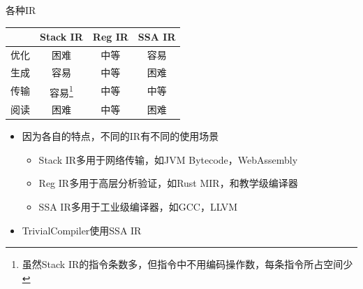 \documentclass{beamer}
\begin{document}
\begin{frame}{各种IR}
\begin{table}[]
  \centering
  \begin{tabular}{|c|c|c|c|}
    \hline
    & Stack IR & Reg IR & SSA IR \\ \hline
    优化 & \textcolor[rgb]{1,0,0}{困难}       & 中等     & \textcolor[rgb]{0,1,0.2}{容易}     \\ \hline
    生成 & \textcolor[rgb]{0,1,0.2}{容易}       & 中等     & \textcolor[rgb]{1,0,0}{困难}     \\ \hline
    传输 & \textcolor[rgb]{0,1,0.2}{容易}\footnote[1]{虽然Stack IR的指令条数多，但指令中不用编码操作数，每条指令所占空间少}       & 中等     & 中等     \\ \hline
    阅读 & \textcolor[rgb]{1,0,0}{困难}       & 中等     & \textcolor[rgb]{1,0,0}{困难}     \\ \hline
  \end{tabular}
\end{table}
\begin{itemize}
  \item 因为各自的特点，不同的IR有不同的使用场景
  \begin{itemize}
    \item Stack IR多用于网络传输，如JVM Bytecode，WebAssembly
    \item Reg IR多用于高层分析验证，如Rust MIR，和教学级编译器
    \item SSA IR多用于工业级编译器，如GCC，LLVM
  \end{itemize}
  \item TrivialCompiler使用SSA IR
\end{itemize}
\end{frame}
\end{document}
